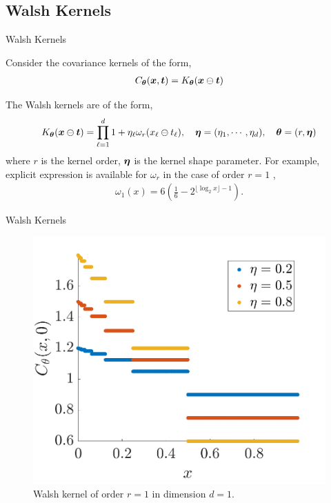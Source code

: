 \documentclass[handout, 10pt,compress,xcolor={usenames,dvipsnames}]{beamer} %
\newcommand{\bm}[1]{\boldsymbol{#1}}
\renewcommand{\vtheta}{{\bm{\theta}}}
\begin{document}
\subsection{Walsh Kernels}

\begin{frame}{Walsh Kernels}

Consider the covariance kernels of the form,
\begin{align}
\label{eqn:digital_shift_in_kernel}
C_{\vtheta}(\vx, \vt) = K_{\vtheta} (\vx \ominus \vt) 
\end{align}

The Walsh kernels are of the form,
\begin{align}
\label{eqn:walsh_kernel}
K_{\vtheta} (\vx \ominus \vt) =  
\prod_{\ell=1}^d  1 + \eta_\ell \omega_{r} (x_\ell \ominus t_\ell), \quad \veta = (\eta_1, \cdots, \eta_d), \quad \vtheta = (r, \veta)
\end{align}
where $r$ is the kernel order, $\boldsymbol{\eta}$ is the kernel shape parameter.
For example, explicit expression is available for $\omega_{r}$ in the case of order $r=1$ \cite{Nuyens2013}, %
\begin{align}
\label{eqn:omega1}
\omega_1(x) 
= 6\left( \frac 16 - 2^{\lfloor \log_2 x \rfloor -1 }\right).
\end{align}
\end{frame}


\begin{frame}{Walsh Kernels}
	\vspace{-6ex}
\begin{figure}
	\centering
	\includegraphics[width=0.7\linewidth]{"../figures/walsh_kernel dim_1"}
	\caption[Walsh kernel]{Walsh kernel of order $r=1$ in dimension $d=1$. } 
	\label{fig:walshkernel-dim1}
\end{figure}
\end{frame}
\end{document}
